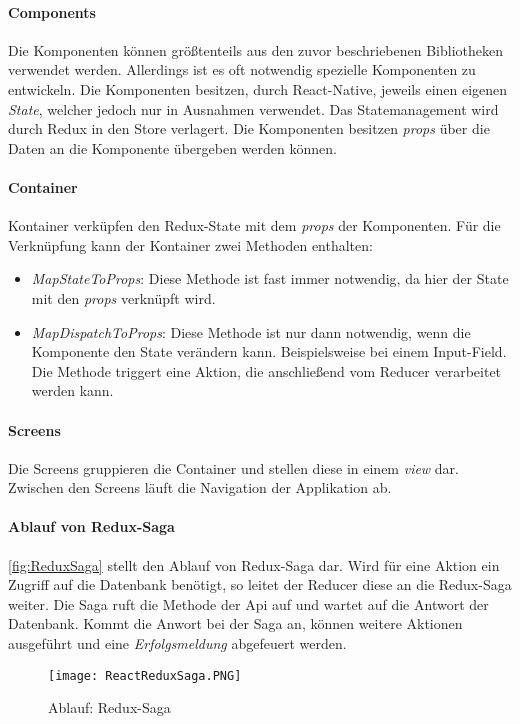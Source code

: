 \paragraph{Components}
Die Komponenten können größtenteils aus den zuvor beschriebenen Bibliotheken verwendet werden.
Allerdings ist es oft notwendig spezielle Komponenten zu entwickeln. Die Komponenten besitzen, durch React-Native,
jeweils einen eigenen \textit{State}, welcher jedoch nur in Ausnahmen verwendet. Das Statemanagement wird
durch Redux in den Store verlagert. Die Komponenten besitzen \textit{props} über die
Daten an die Komponente übergeben werden können.

\paragraph{Container}
Kontainer verküpfen den Redux-State mit dem \textit{props} der Komponenten. Für die Verknüpfung
kann der Kontainer zwei Methoden enthalten:
\begin{itemize}
    \item \textit{MapStateToProps}: Diese Methode ist fast immer notwendig, da hier der State mit den \textit{props} verknüpft wird.
    \item \textit{MapDispatchToProps}: Diese Methode ist nur dann notwendig, wenn die Komponente den State verändern kann. Beispielsweise bei einem Input-Field.
    Die Methode triggert eine Aktion, die anschließend vom Reducer verarbeitet werden kann.
\end{itemize}

\paragraph{Screens}
Die Screens gruppieren die Container und stellen diese in einem \textit{view} dar.
Zwischen den Screens läuft die Navigation der Applikation ab.

\paragraph{Ablauf von Redux-Saga}
\autoref{fig:ReduxSaga} stellt den Ablauf von Redux-Saga dar. Wird für eine Aktion ein Zugriff auf die Datenbank
benötigt, so leitet der Reducer diese an die Redux-Saga weiter. Die Saga ruft die Methode der Api auf und wartet auf
die Antwort der Datenbank. Kommt die Anwort bei der Saga an, können weitere Aktionen ausgeführt und eine 
\textit{Erfolgsmeldung} abgefeuert werden.

\begin{figure}[h]
    \centering
    \texttt{[image: ReactReduxSaga.PNG]}
    \caption{Ablauf: Redux-Saga}
    \label{fig:ReduxSaga}
\end{figure}

